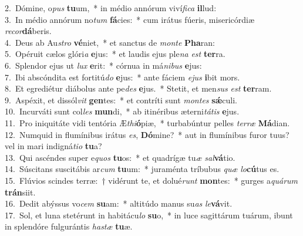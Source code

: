 {2.~}Dómine, o\textit{pus} \textbf{tu}um,~* in médio annórum viví\textit{fi}\textit{ca} \textbf{il}lud:\\
{3.~}In médio annórum no\textit{tum} \textbf{fá}cies:~* cum irátus fúeris, misericórdiæ \textit{re}\textit{cor}\textbf{dá}beris.\\
{4.~}Deus ab Au\textit{stro} \textbf{vé}niet,~* et sanctus de \textit{mon}\textit{te} \textbf{Pha}ran:\\
{5.~}Opéruit cælos glóri\textit{a} \textbf{e}jus:~* et laudis ejus ple\textit{na} \textit{est} \textbf{ter}ra.\\
{6.~}Splendor ejus ut \textit{lux} \textbf{e}rit:~* córnua in má\textit{ni}\textit{bus} \textbf{e}jus:\\
{7.~}Ibi abscóndita est fortitú\textit{do} \textbf{e}jus:~* ante fáciem \textit{e}\textit{jus} \textbf{i}bit mors.\\
{8.~}Et egrediétur diábolus ante pe\textit{des} \textbf{e}jus.~* Stetit, et men\textit{sus} \textit{est} \textbf{ter}ram.\\
{9.~}Aspéxit, et dissól\textit{vit} \textbf{gen}tes:~* et contríti sunt \textit{mon}\textit{tes} \textbf{sǽ}culi.\\
{10.~}Incurváti sunt col\textit{les} \textbf{mun}di,~* ab itinéribus æterni\textit{tá}\textit{tis} \textbf{e}jus.\\
{11.~}Pro iniquitáte vidi tentória Æ\textit{thi}\textbf{ó}piæ,~* turbabúntur pelles \textit{ter}\textit{ræ} \textbf{Má}dian.\\
{12.~}Numquid in flumínibus irátus \textit{es}, \textbf{Dó}mine?~* aut in flumínibus furor tuus? vel in mari indigná\textit{ti}\textit{o} \textbf{tu}a?\\
{13.~}Qui ascéndes super e\textit{quos} \textbf{tu}os:~* et quadrígæ tu\textit{æ} \textit{sal}\textbf{vá}tio.\\
{14.~}Súscitans suscitábis ar\textit{cum} \textbf{tu}um:~* juraménta tríbubus \textit{quæ} \textit{lo}\textbf{cú}tus es.\\
{15.~}Flúvios scindes terræ:~† vidérunt te, et dolué\textit{runt} \textbf{mon}tes:~* gurges a\textit{quá}\textit{rum} \textbf{trán}siit.\\
{16.~}Dedit abýssus vo\textit{cem} \textbf{su}am:~* altitúdo manus su\textit{as} \textit{le}\textbf{vá}vit.\\
{17.~}Sol, et luna stetérunt in habitácu\textit{lo} \textbf{su}o,~* in luce sagittárum tuárum, ibunt in splendóre fulgurántis \textit{ha}\textit{stæ} \textbf{tu}æ.\\

